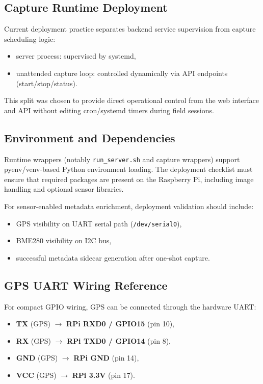\subsection{Capture Runtime Deployment}
Current deployment practice separates backend service supervision from capture scheduling logic:
\begin{itemize}
  \item server process: supervised by systemd,
  \item unattended capture loop: controlled dynamically via API endpoints (start/stop/status).
\end{itemize}

This split was chosen to provide direct operational control from the web interface and API without editing cron/systemd timers during field sessions.

\subsection{Environment and Dependencies}
Runtime wrappers (notably \texttt{run\_server.sh} and capture wrappers) support pyenv/venv-based Python environment loading. The deployment checklist must ensure that required packages are present on the Raspberry Pi, including image handling and optional sensor libraries.

For sensor-enabled metadata enrichment, deployment validation should include:
\begin{itemize}
  \item GPS visibility on UART serial path (\texttt{/dev/serial0}),
  \item BME280 visibility on I2C bus,
  \item successful metadata sidecar generation after one-shot capture.
\end{itemize}

\subsection{GPS UART Wiring Reference}
For compact GPIO wiring, GPS can be connected through the hardware UART:
\begin{itemize}
  \item \textbf{TX} (GPS) $\rightarrow$ \textbf{RPi RXD0 / GPIO15} (pin 10),
  \item \textbf{RX} (GPS) $\rightarrow$ \textbf{RPi TXD0 / GPIO14} (pin 8),
  \item \textbf{GND} (GPS) $\rightarrow$ \textbf{RPi GND} (pin 14),
  \item \textbf{VCC} (GPS) $\rightarrow$ \textbf{RPi 3.3V} (pin 17).
\end{itemize}


